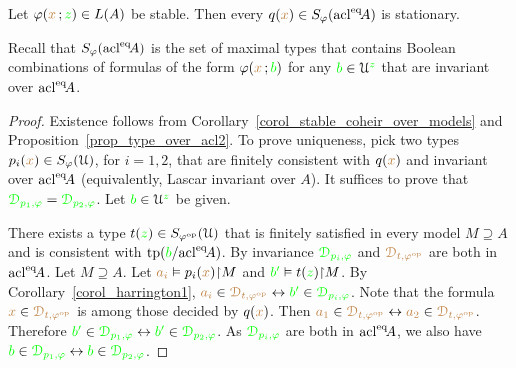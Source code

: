 \begin{theorem}\label{thm_stationarity}
  Let $\varphi({\color{brown} x}\,;{\color{green} z})\in L(A)$ be stable.
  Then every $q({\color{brown} x})\in S_\varphi({\rm acl}^{{\rm eq}}\!A)$ is stationary.
\end{theorem}

Recall that \emph{$S_\varphi({\rm acl}^{{\rm eq}}\!A)$\/} is the set of maximal types that contains Boolean combinations of formulas of the form $\varphi({\color{brown} x}\,;{\color{green} b})$ for any ${\color{green} b}\in\EuScript U^{\color{green} z}$ that are invariant over ${\rm acl}^{{\rm eq}}\!A$.

\vspace*{-\parskip}
\begin{proof}
  Existence follows from Corollary~\ref{corol_stable_coheir_over_models} and Proposition~\ref{prop_type_over_acl2}.
  To prove uniqueness, pick two types $p_i({\color{brown} x})\in S_\varphi(\EuScript U)$, for $i=1,2$, that are finitely consistent with $q({\color{brown} x})$ and invariant over ${\rm acl}^{{\rm eq}}\!A$ (equivalently, Lascar invariant over $A$).
  It suffices to prove that ${\color{green}\EuScript D_{p_1,\varphi}}={\color{green}\EuScript D_{p_2,\varphi}}$.
  Let ${\color{green} b}\in\EuScript U^{\color{green} z}$ be given.

  There exists a type $t({\color{green} z})\in S_{\varphi^{\rm op}}(\EuScript U)$ that is finitely satisfied in every model $M\supseteq A$ and is consistent with ${\rm tp}({\color{green} b}/{\rm acl}^{{\rm eq}}\!A)$.
  By invariance ${\color{green}\EuScript D_{p_i,\varphi}}$ and ${\color{brown}\EuScript D_{t,\varphi^{\rm op}}}$ are both in ${\rm acl}^{{\rm eq}}\!A$.
  Let $M\supseteq A$.
  Let ${\color{brown} a_i}\vDash p_i({\color{brown} x}){\restriction}M$ and ${\color{green} b'}\vDash t({\color{green} z}){\restriction}M$.
  By Corollary~\ref{corol_harrington1}, ${\color{brown} a_i}\in{\color{brown}\EuScript D_{t,\varphi^{\rm op}}}\leftrightarrow{\color{green}b'}\in{\color{green}\EuScript D_{p_i,\varphi}}$.
  Note that the formula ${\color{brown} x}\in{\color{brown}\EuScript D_{t,\varphi^{\rm op}}}$ is among those decided by $q({\color{brown} x})$.
  Then ${\color{brown} a_1}\in{\color{brown}\EuScript D_{t,\varphi^{\rm op}}}\leftrightarrow{\color{brown}a_2}\in{\color{brown}\EuScript D_{t,\varphi^{\rm op}}}$.
  Therefore ${\color{green} b'}\in{\color{green}\EuScript D_{p_1,\varphi}}\leftrightarrow{\color{green}b'}\in{\color{green}\EuScript D_{p_2,\varphi}}$.
  As ${\color{green}\EuScript D_{p_i,\varphi}}$ are both in ${\rm acl}^{{\rm eq}}\!A$, we also have  ${\color{green} b}\in{\color{green}\EuScript D_{p_1,\varphi}}\leftrightarrow{\color{green}b}\in{\color{green}\EuScript D_{p_2,\varphi}}$.
\end{proof}



